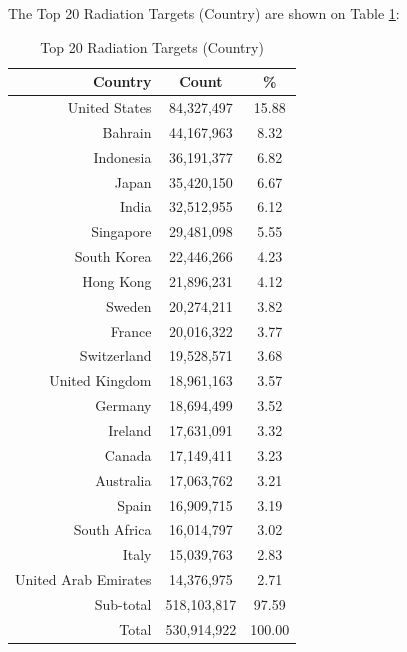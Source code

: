 \newpage
The Top 20 Radiation Targets (Country) are shown on Table \ref{tab:top20radiationtargets(country)}:
\begin{table}[!h]
\begin{center}
\caption{Top 20 Radiation Targets (Country)}
\label{tab:top20radiationtargets(country)}
\begin{tabular}{ |r|c|c| }
\hline
\centering Country & Count & \%  \\
\hline
United States & 84,327,497 & 15.88  \\
Bahrain & 44,167,963 & 8.32  \\
Indonesia & 36,191,377 & 6.82  \\
Japan & 35,420,150 & 6.67  \\
India & 32,512,955 & 6.12  \\
Singapore & 29,481,098 & 5.55  \\
South Korea & 22,446,266 & 4.23  \\
Hong Kong & 21,896,231 & 4.12  \\
Sweden & 20,274,211 & 3.82  \\
France & 20,016,322 & 3.77  \\
Switzerland & 19,528,571 & 3.68  \\
United Kingdom & 18,961,163 & 3.57  \\
Germany & 18,694,499 & 3.52  \\
Ireland & 17,631,091 & 3.32  \\
Canada & 17,149,411 & 3.23  \\
Australia & 17,063,762 & 3.21  \\
Spain & 16,909,715 & 3.19  \\
South Africa & 16,014,797 & 3.02  \\
Italy & 15,039,763 & 2.83  \\
United Arab Emirates & 14,376,975 & 2.71  \\
\hline
Sub-total & 518,103,817 & 97.59  \\
\hline
Total & 530,914,922 & 100.00  \\
\hline
\end{tabular}
\end{center}
\end{table}

